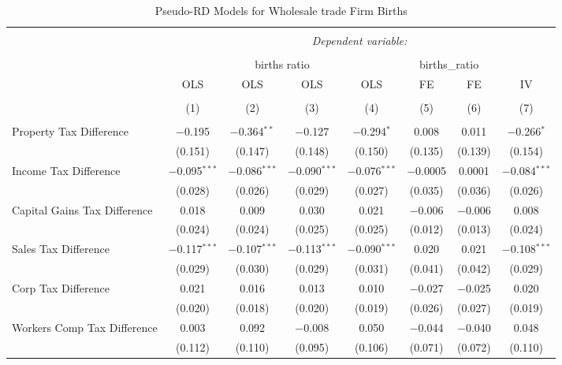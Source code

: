 
\begin{table}[!htbp] \centering 
  \caption{Pseudo-RD Models for  Wholesale trade Firm Births} 
  \label{} 
\begin{tabular}{@{\extracolsep{5pt}}lccccccc} 
\\[-1.8ex]\hline 
\hline \\[-1.8ex] 
 & \multicolumn{7}{c}{\textit{Dependent variable:}} \\ 
\cline{2-8} 
\\[-1.8ex] & \multicolumn{4}{c}{births ratio} & \multicolumn{2}{c}{births\_ratio} &   \\ 
 & OLS & OLS & OLS & OLS & FE & FE & IV \\ 
\\[-1.8ex] & (1) & (2) & (3) & (4) & (5) & (6) & (7)\\ 
\hline \\[-1.8ex] 
 Property Tax Difference & $-$0.195 & $-$0.364$^{**}$ & $-$0.127 & $-$0.294$^{*}$ & 0.008 & 0.011 & $-$0.266$^{*}$ \\ 
  & (0.151) & (0.147) & (0.148) & (0.150) & (0.135) & (0.139) & (0.154) \\ 
  Income Tax Difference & $-$0.095$^{***}$ & $-$0.086$^{***}$ & $-$0.090$^{***}$ & $-$0.076$^{***}$ & $-$0.0005 & 0.0001 & $-$0.084$^{***}$ \\ 
  & (0.028) & (0.026) & (0.029) & (0.027) & (0.035) & (0.036) & (0.026) \\ 
  Capital Gains Tax Difference & 0.018 & 0.009 & 0.030 & 0.021 & $-$0.006 & $-$0.006 & 0.008 \\ 
  & (0.024) & (0.024) & (0.025) & (0.025) & (0.012) & (0.013) & (0.024) \\ 
  Sales Tax Difference & $-$0.117$^{***}$ & $-$0.107$^{***}$ & $-$0.113$^{***}$ & $-$0.090$^{***}$ & 0.020 & 0.021 & $-$0.108$^{***}$ \\ 
  & (0.029) & (0.030) & (0.029) & (0.031) & (0.041) & (0.042) & (0.029) \\ 
  Corp Tax Difference & 0.021 & 0.016 & 0.013 & 0.010 & $-$0.027 & $-$0.025 & 0.020 \\ 
  & (0.020) & (0.018) & (0.020) & (0.019) & (0.026) & (0.027) & (0.019) \\ 
  Workers Comp Tax Difference & 0.003 & 0.092 & $-$0.008 & 0.050 & $-$0.044 & $-$0.040 & 0.048 \\ 
  & (0.112) & (0.110) & (0.095) & (0.106) & (0.071) & (0.072) & (0.110) \\ 

\end{tabular}
\end{table}

